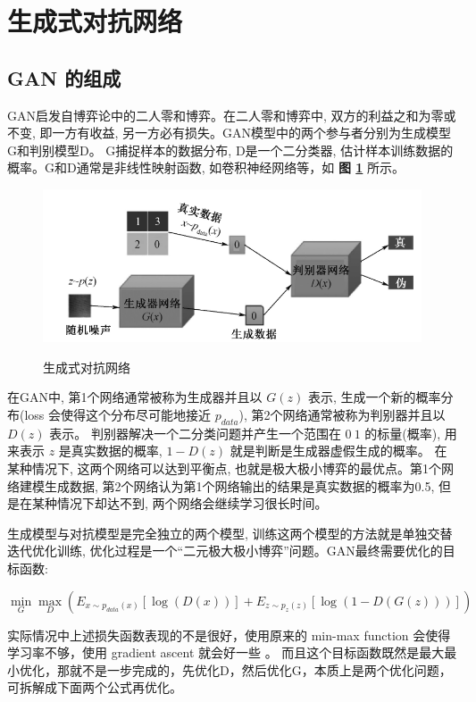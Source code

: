 \section{生成式对抗网络}

\subsection{GAN 的组成}
GAN启发自博弈论中的二人零和博弈。在二人零和博弈中, 双方的利益之和为零或不变, 即一方有收益, 另一方必有损失。GAN模型中的两个参与者分别为生成模型G和判别模型D。
G捕捉样本的数据分布, D是一个二分类器, 估计样本训练数据的概率。G和D通常是非线性映射函数, 如卷积神经网络等，如 \textbf{图 \ref{fig:gan}} 所示。

\begin{figure}[h!]
	\caption{生成式对抗网络}
	\centering
	\includegraphics[width=\textwidth]{gan.png}
	\label{fig:gan}
\end{figure}


在GAN中, 第1个网络通常被称为生成器并且以 $G(z)$ 表示, 生成一个新的概率分布(loss 会使得这个分布尽可能地接近 $p_{data}$), 第2个网络通常被称为判别器并且以 $D(z)$ 表示。
判别器解决一个二分类问题并产生一个范围在 $0~1$ 的标量(概率), 用来表示 $z$ 是真实数据的概率, $1 - D(z)$ 就是判断是生成器虚假生成的概率。
在某种情况下, 这两个网络可以达到平衡点, 也就是极大极小博弈的最优点。第1个网络建模生成数据, 第2个网络认为第1个网络输出的结果是真实数据的概率为0.5, 但是在某种情况下却达不到, 两个网络会继续学习很长时间。


生成模型与对抗模型是完全独立的两个模型, 训练这两个模型的方法就是单独交替迭代优化训练, 优化过程是一个“二元极大极小博弈”问题。GAN最终需要优化的目标函数:

\begin{equation}
\min_G \max_D (E_{x \sim p_{data}(x)} [\log (D(x)) ] + E_{z \sim p_z(z)} [ \log (1 - D(G(z)))])
\end{equation}


实际情况中上述损失函数表现的不是很好，使用原来的 min-max function 会使得学习率不够，使用 gradient ascent 就会好一些 \cite{GAN}。
而且这个目标函数既然是最大最小优化，那就不是一步完成的，先优化D，然后优化G，本质上是两个优化问题，可拆解成下面两个公式再优化。


